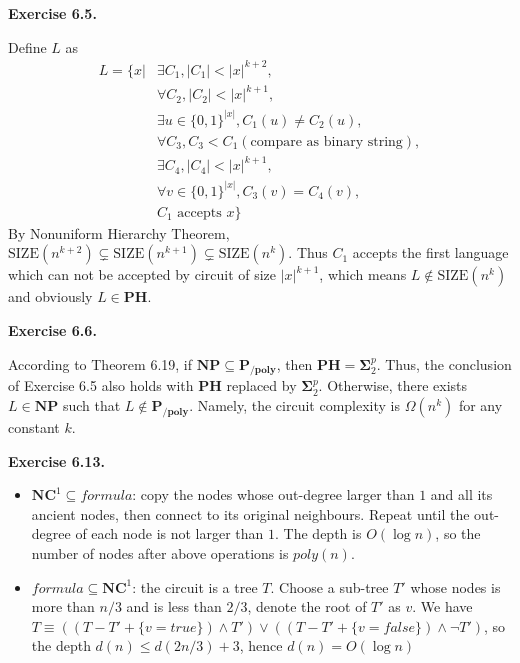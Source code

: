 \documentclass[a4paper]{article}
\newenvironment{exercise}[1]{
	\par
	\noindent\textbf{Exercise #1.}\quad
}{
	\par
	\bigskip
}
\newcommand{\bin}{\{0,1\}}
\begin{document}
\begin{exercise}{6.5}
    Define $L$ as
    \begin{align*}
        L=\Big\{x\Big|
        &\exists C_1,|C_1|<|x|^{k+2},\\
        &\forall C_2,|C_2|<|x|^{k+1},\\
        &\exists u\in\bin^{|x|},C_1(u)\neq C_2(u),\\
        &\forall C_3,C_3<C_1 (\text{compare as binary string}),\\
        &\exists C_4,|C_4|<|x|^{k+1},\\
        &\forall v\in\bin^{|x|},C_3(v)=C_4(v),\\
        &C_1\text{ accepts }x\Big\}
    \end{align*}
    By Nonuniform Hierarchy Theorem, $\text{SIZE}(n^{k+2})\subsetneq\text{SIZE}(n^{k+1})\subsetneq\text{SIZE}(n^k)$.
    Thus $C_1$ accepts the first language which can not be accepted by circuit of size $|x|^{k+1}$, which means
    $L\notin\text{SIZE}(n^k)$ and obviously $L\in\textbf{PH}$.
\end{exercise}


\begin{exercise}{6.6}
    According to Theorem 6.19, if $\textbf{NP} \subseteq \textbf{P}_{\textbf{/poly}}$, then $\textbf{PH} = \mathbf{\Sigma}_2^p$. Thus, the conclusion of Exercise 6.5 also holds with $\mathbf{PH}$ replaced by $\mathbf{\Sigma}_2^p$. Otherwise, there exists $L \in \textbf{NP}$ such that $L \not\in \textbf{P}_{\textbf{/poly}}$. Namely, the circuit complexity is $\Omega(n^k)$ for any constant $k$.
\end{exercise}


\begin{exercise}{6.13}
\begin{itemize}
\item $\textbf{NC}^1 \subseteq formula$: copy the nodes  whose out-degree larger than $1$ and all its ancient nodes, then connect to its original neighbours. Repeat until the out-degree of each node is not larger than $1$. The depth is $O(\log n)$, so the number of nodes after above operations is $poly(n)$.
\item $ formula \subseteq\textbf{NC}^1$: the circuit is a tree $T$. Choose a sub-tree $T'$ whose nodes is more than $n/3$ and is less than $2/3$, denote the root of $T'$ as $v$.
We have $T\equiv((T-T'+\{v=true\})\wedge T')\vee((T-T'+\{v=false\})\wedge \neg T')$, so the depth $d(n)\le d(2n/3)+3$, hence $d(n)=O(\log n)$
\end{itemize}
\end{exercise}
\end{document}
